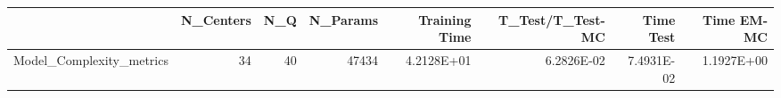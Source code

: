\begin{tabular}{lrrrrrrr}
\toprule
{} &  N\_Centers &  N\_Q &  N\_Params &  Training Time &  T\_Test/T\_Test-MC &  Time Test &  Time EM-MC \\
\midrule
Model\_Complexity\_metrics &         34 &   40 &     47434 &     4.2128E+01 &        6.2826E-02 & 7.4931E-02 &  1.1927E+00 \\
\bottomrule
\end{tabular}
